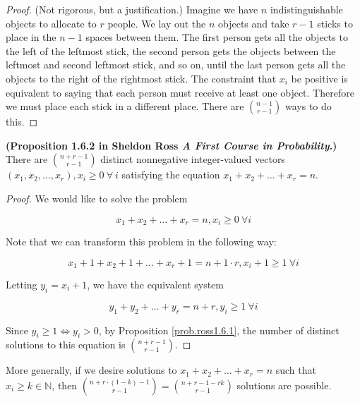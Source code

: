 \begin{proof} (Not rigorous, but a justification.) Imagine we have \(n\) indistinguishable objects to allocate to \(r\) people. We lay out the \(n\) objects and take \(r - 1\) sticks to place in the \(n - 1\) spaces between them. The first person gets all the objects to the left of the leftmost stick, the second person gets the objects between the leftmost and second leftmost stick, and so on, until the last person gets all the objects to the right of the rightmost stick. The constraint that \(x_i\) be positive is equivalent to saying that each person must receive at least one object. Therefore we must place each stick in a different place. There are \(\binom{n-1}{r-1}\) ways to do this. 

\end{proof}

\begin{proposition} \label{prob.ross1.6.2} \textbf{(Proposition 1.6.2 in Sheldon Ross \textit{A First Course in Probability}.)} There are \(\binom{n+r-1}{r-1}\) distinct nonnegative integer-valued vectors \((x_1, x_2, \ldots, x_r), x_i \geq 0 \ \forall \ i\) satisfying the equation \(x_1 + x_2 + \ldots + x_r = n\).

\end{proposition}

\begin{proof}We would like to solve the problem

\[
x_1  + x_2 + \ldots + x_r  = n , x_i  \geq 0 \ \forall i
\]

Note that we can transform this problem in the following way:

\[
x_1 + 1 + x_2 + 1 + \ldots + x_r + 1 = n + 1 \cdot r, x_i + 1 \geq 1 \ \forall i
\]

Letting \(y_i = x_i + 1\), we have the equivalent system

\[
y_1 + y_2 + \ldots + y_r = n + r, y_i \geq 1 \ \forall i
\]

Since \(y_i \geq 1 \iff y_i > 0\), by Proposition \ref{prob.ross1.6.1}, the number of distinct solutions to this equation is \(\binom{n+r-1}{r-1}  \).

\end{proof}

\begin{proposition}\label{prob.ross1.6.2general} More generally, if we desire solutions to \(x_1 + x_2 + \ldots + x_r = n\) such that  \(x_i \geq k \in \mathbb{N}\), then \(\binom{n + r\cdot(1-k)-1}{r-1} = \binom{n + r - 1 - rk}{r-1}\) solutions are possible.

\end{proposition}

